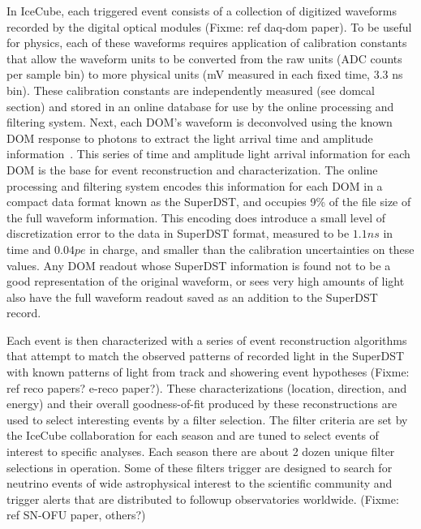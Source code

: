 In IceCube, each triggered event consists of a collection of digitized waveforms recorded by the digital optical modules (Fixme: ref daq-dom paper).
To be useful for physics, each of these waveforms requires application of calibration constants that allow the waveform units
to be converted from the raw units (ADC counts per sample bin) to more physical units (mV measured in each fixed time, 3.3 ns bin).  These
calibration constants are independently measured (see domcal section) and stored in an online database for use by
the online processing and filtering system.  Next, each DOM's waveform is deconvolved using the known DOM response
to photons to extract the light arrival time and amplitude information~\cite{IC3:ereco}.  
This series of time and amplitude light arrival information
for each DOM is the base for event reconstruction and characterization.  The online processing and filtering system encodes
this information for each DOM in a compact data format known as the SuperDST, and occupies 9\%  of the file size
of the full waveform information.  This encoding does introduce a small level of discretization error to the
data in SuperDST format, measured to be $1.1ns$ in time and $0.04pe$ in charge, and smaller than the calibration
uncertainties on these values.  Any DOM readout whose SuperDST information is found not to be a good representation of the
original waveform, or sees very high amounts of light also have the full waveform readout saved as an addition to the SuperDST record.


Each event is then characterized with a series of event reconstruction algorithms that attempt to match
the observed patterns of recorded light in the SuperDST with known patterns of light
from track and showering event hypotheses (Fixme: ref reco papers?  e-reco paper?).  These characterizations (location, direction, and energy) and their
overall goodness-of-fit produced by these reconstructions are used to select interesting
events by a filter selection.  The filter criteria are set by the IceCube collaboration for each season
and are tuned to select events of interest to specific analyses.  Each season there are
about 2 dozen unique filter selections in operation.  Some of these filters trigger are
designed to search for neutrino events of wide astrophysical interest to the scientific community and trigger
alerts that are distributed to followup observatories worldwide. (Fixme: ref SN-OFU paper, others?)

